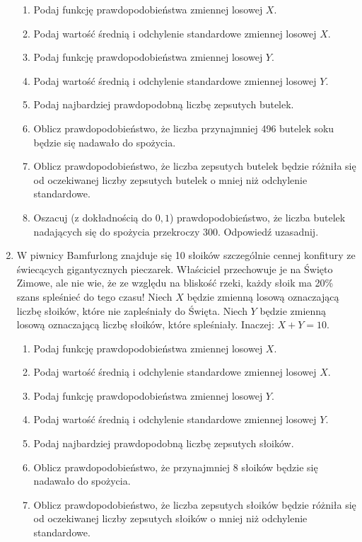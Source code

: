 \documentclass{mwart}
\begin{document}
\begin{enumerate}
\begin{enumerate}
\item Podaj funkcję prawdopodobieństwa zmiennej losowej $X$.
\item Podaj wartość średnią i odchylenie standardowe zmiennej losowej $X$.
\item Podaj funkcję prawdopodobieństwa zmiennej losowej $Y$.
\item Podaj wartość średnią i odchylenie standardowe zmiennej losowej $Y$.
\item Podaj najbardziej prawdopodobną liczbę zepsutych butelek.
\item Oblicz prawdopodobieństwo, że liczba przynajmniej 496 butelek soku będzie się nadawało do spożycia.
\item Oblicz prawdopodobieństwo, że liczba zepsutych butelek będzie różniła się od oczekiwanej liczby zepsutych butelek o mniej niż odchylenie standardowe.
\item Oszacuj (z dokładnością do $0{,}1$) prawdopodobieństwo, że liczba butelek nadających się do spożycia przekroczy 300. Odpowiedź uzasadnij.
\end{enumerate}
\item W piwnicy Bamfurlong znajduje się 10 słoików szczególnie cennej konfitury ze świecących gigantycznych pieczarek.
Właściciel przechowuje je na Święto Zimowe, ale nie wie, że ze względu na bliskość rzeki, każdy słoik ma 20\% szans spleśnieć do tego czasu!
Niech $X$ będzie zmienną losową oznaczającą liczbę słoików, które nie zapleśniały do Święta.
Niech $Y$ będzie zmienną losową oznaczającą liczbę słoików, które spleśniały.
Inaczej: $X+Y=10$.

\begin{enumerate}
\item Podaj funkcję prawdopodobieństwa zmiennej losowej $X$.
\item Podaj wartość średnią i odchylenie standardowe zmiennej losowej $X$.
\item Podaj funkcję prawdopodobieństwa zmiennej losowej $Y$.
\item Podaj wartość średnią i odchylenie standardowe zmiennej losowej $Y$.
\item Podaj najbardziej prawdopodobną liczbę zepsutych słoików.
\item Oblicz prawdopodobieństwo, że przynajmniej 8 słoików będzie się nadawało do spożycia.
\item Oblicz prawdopodobieństwo, że liczba zepsutych słoików będzie różniła się od oczekiwanej liczby zepsutych słoików o mniej niż odchylenie standardowe.
\end{enumerate}
\end{enumerate}
\end{document}
